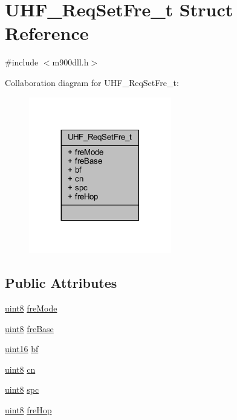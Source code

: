 \hypertarget{struct_u_h_f___req_set_fre__t}{}\section{U\+H\+F\+\_\+\+Req\+Set\+Fre\+\_\+t Struct Reference}
\label{struct_u_h_f___req_set_fre__t}


{\ttfamily \#include $<$m900dll.\+h$>$}



Collaboration diagram for U\+H\+F\+\_\+\+Req\+Set\+Fre\+\_\+t\+:
\nopagebreak
\begin{figure}[H]
\begin{center}
\leavevmode
\includegraphics[width=176pt]{struct_u_h_f___req_set_fre__t__coll__graph}
\end{center}
\end{figure}
\subsection*{Public Attributes}
\begin{DoxyCompactItemize}
\item 
\mbox{\hyperlink{m900dll_8h_adde6aaee8457bee49c2a92621fe22b79}{uint8}} \mbox{\hyperlink{struct_u_h_f___req_set_fre__t_ae69deb485d1de033ea262dea9d098f17}{fre\+Mode}}
\item 
\mbox{\hyperlink{m900dll_8h_adde6aaee8457bee49c2a92621fe22b79}{uint8}} \mbox{\hyperlink{struct_u_h_f___req_set_fre__t_ad987d4e21fc79b8e298fad62ebb3abf9}{fre\+Base}}
\item 
\mbox{\hyperlink{m900dll_8h_a05f6b0ae8f6a6e135b0e290c25fe0e4e}{uint16}} \mbox{\hyperlink{struct_u_h_f___req_set_fre__t_a8f62c70752fadc3961910e2439e9e024}{bf}}
\item 
\mbox{\hyperlink{m900dll_8h_adde6aaee8457bee49c2a92621fe22b79}{uint8}} \mbox{\hyperlink{struct_u_h_f___req_set_fre__t_a0aa3a630e4bb8f0c8490d44daba6c830}{cn}}
\item 
\mbox{\hyperlink{m900dll_8h_adde6aaee8457bee49c2a92621fe22b79}{uint8}} \mbox{\hyperlink{struct_u_h_f___req_set_fre__t_a77b638699a7c4deb45d6eff48dddefe5}{spc}}
\item 
\mbox{\hyperlink{m900dll_8h_adde6aaee8457bee49c2a92621fe22b79}{uint8}} \mbox{\hyperlink{struct_u_h_f___req_set_fre__t_a82519ffab1150c781e96fecc9523b112}{fre\+Hop}}
\end{DoxyCompactItemize}


